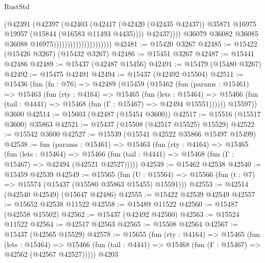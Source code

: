 \begin{lexlean}{RustStd}
\begin{coremodule}
                                                  (@42391
                                                    (@42397
                                                      (@42403
                                                        (@42417
                                                          (@42420 (@42435 @42437))
                                                          @35871
                                                          @16975
                                                          @19957
                                                          (@15844 (@16583 @11493 @4435))))
                                                      @42437))))
                                              @36079
                                              @36082
                                              @36085
                                              @36088
                                              @16975)))))))))))))))))))))
@42481 := @15420 @3267
@42485 := @15422 (@15426 @3267) (@15432 @3267)
@42486 := @15451 @3267
@42487 := @15441 @42486
@42489 := @15437 (@42487 @15456)
@42491 := @15479 (@15480 @3267)
@42492 := @15475 @42491
@42494 := @15437 (@42492 @15504)
@42511 := @15436
    (fun (fn : @76) =>
    @42489
      (@15459
        (@15462
          (fun (params : @15461) =>
          @15463
            (fun (rty : @4164) =>
            @15465
              (fun (lets : @15464) =>
              @15466 (fun (tail : @4441) => @15468 (fun (Γ : @15467) => @42494 @15551))))))
        @15597))
    @3600
@42514 := @15603 (@42487 (@15454 @3600))
@42517 := @15516 (@15517 @3600) @35863
@42521 := @15437 (@15508 (@42517 @15525) @15529)
@42522 := @15542 @3600
@42527 := @15539 (@15541 @42522 @35866 @15497 @15499)
@42538 := fun (params : @15461) =>
  @15463
    (fun (rty : @4164) =>
    @15465
      (fun (lets : @15464) =>
      @15466 (fun (tail : @4441) => @15468 (fun (Γ : @15467) => @42494 (@42521 @42527)))))
@42539 := @15462 @42538
@42540 := @15459 @42539
@42549 := @15565
    (fun (U : @15564) => @15566 (fun (t : @7) => @15574 (@15437 (@15580 @35863 @15455) @15591)))
@42553 := @42514 (@42540 @42549) (@15647 @42486)
@42555 := @15422 @42539 @42549
@42557 := @15652 @42538 @11522
@42558 := @15489 @11522
@42560 := @15487 (@42558 @15502)
@42562 := @15437 (@42492 @42560)
@42563 := @15524 @11522
@42564 := @42517 @42563
@42565 := @15508 @42564
@42567 := @15437 (@42565 @15529)
@42578 := @15655
    (fun (rty : @4164) =>
    @15465
      (fun (lets : @15464) =>
      @15466 (fun (tail : @4441) => @15468 (fun (Γ : @15467) => @42562 (@42567 @42527)))))
    @4203

\end{coremodule}
\end{lexlean}
